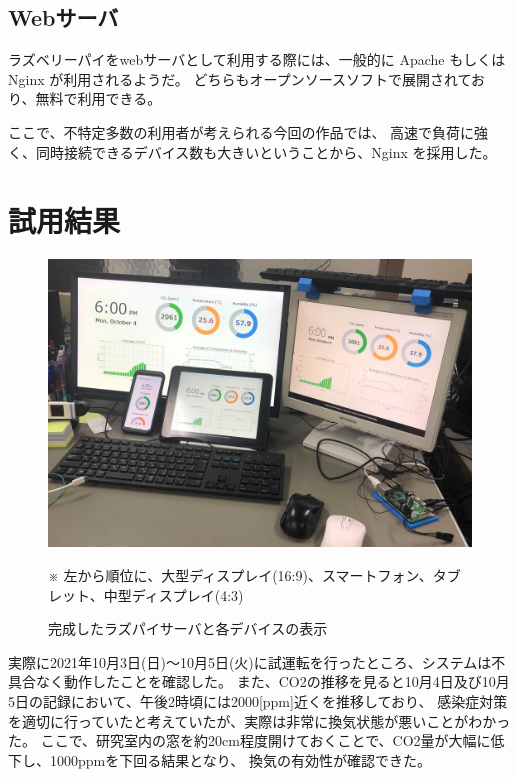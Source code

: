 \documentclass[a4paper]{jsarticle}
\begin{document}
\subsection{Webサーバ}
ラズベリーパイをwebサーバとして利用する際には、一般的に Apache もしくは Nginx が利用されるようだ。
どちらもオープンソースソフトで展開されており、無料で利用できる。\par
ここで、不特定多数の利用者が考えられる今回の作品では、
高速で負荷に強く、同時接続できるデバイス数も大きいということから、Nginx を採用した。
\section{試用結果}
\begin{figure}[htbp]
    \begin{center}
        \includegraphics[width=140mm]{images/image.jpg}
        \caption{完成したラズパイサーバと各デバイスの表示}
    \end{center}
    \begin{center}
        ※ 左から順位に、大型ディスプレイ(16:9)、スマートフォン、タブレット、中型ディスプレイ(4:3)
    \end{center}
\end{figure}
実際に2021年10月3日(日)～10月5日(火)に試運転を行ったところ、システムは不具合なく動作したことを確認した。
また、CO2の推移を見ると10月4日及び10月5日の記録において、午後2時頃には2000[ppm]近くを推移しており、
感染症対策を適切に行っていたと考えていたが、実際は非常に換気状態が悪いことがわかった。
ここで、研究室内の窓を約20cm程度開けておくことで、CO2量が大幅に低下し、1000ppmを下回る結果となり、
換気の有効性が確認できた。\par
\end{document}
